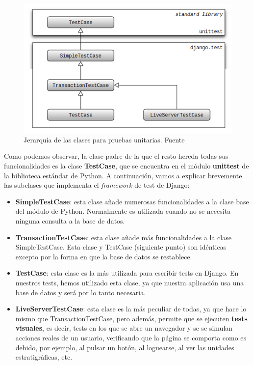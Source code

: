     \begin{figure}[H]
        \centering
        \includegraphics[scale=0.60]{imagenes/classes-hierarchy.png}
        \caption[Jerarquía de las clases para pruebas unitarias.]{Jerarquía de las
        clases para pruebas unitarias. Fuente \cite{classes-hierarchy}}
        \label{fig:classes-hierarchy}
    \end{figure}

Como podemos observar, la clase padre de la que el resto hereda todas sus funcionalidades
es la clase \textbf{TestCase}, que se encuentra en el módulo \textbf{unittest} de la
biblioteca estándar de Python. A continuación, vamos a explicar brevemente las subclases
que implementa el \textit{framework} de test de Django:

    \begin{itemize}
        \item \textbf{SimpleTestCase}: esta clase añade numerosas funcionalidades a la
        clase base del módulo de Python. Normalmente es utilizada cuando no se necesita
        ninguna consulta a la base de datos.
        \item \textbf{TransactionTestCase}: esta clase añade más funcionalidades a la
        clase SimpleTestCase. Esta clase y TestCase (siguiente punto) son idénticas
        excepto por la forma en que la base de datos se restablece.
        \item \textbf{TestCase}: esta clase es la más utilizada para escribir tests en
        Django. En nuestros tests, hemos utilizado esta clase, ya que nuestra aplicación
        usa una base de datos y será por lo tanto necesaria.
        \item \textbf{LiveServerTestCase}: esta clase es la más peculiar de todas, ya que
        hace lo mismo que TransactionTestCase, pero además, permite que se ejecuten
        \textbf{tests visuales}, es decir, tests en los que se abre un navegador y se
        se simulan acciones reales de un usuario, verificando que la página se comporta
        como es debido, por ejemplo, al pulsar un botón, al loguearse, al ver las unidades
        estratigráficas, etc.
    \end{itemize}

